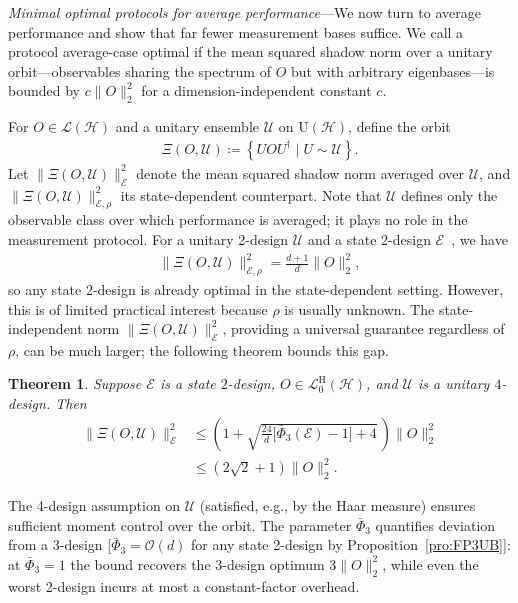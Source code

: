 \documentclass[aps,pra,twocolumn,nofootinbib,superscriptaddress,10pt]{revtex4-2}
\newtheorem{theorem}{Theorem}
\newcommand{\caE}{\mathcal{E}}
\newcommand{\caH}{\mathcal{H}}
\newcommand{\caL}{\mathcal{L}}
\newcommand{\caO}{\mathcal{O}}
\newcommand{\caU}{\mathcal{U}}
\newcommand{\rmH}{\mathrm{H}}
\newcommand{\rmU}{\mathrm{U}}
\newcommand{\bPhi}{\bar{\Phi}}
\newcommand{\pref}[1]{Proposition~\ref{#1}}
\begin{document}

    \emph{Minimal optimal protocols for average performance}---We now turn to average performance and show that far fewer measurement bases suffice. We call a protocol average-case optimal if the mean squared shadow norm over a unitary orbit---observables sharing the spectrum of $O$ but with arbitrary eigenbases---is bounded by $c\|O\|_2^2$ for a dimension-independent constant $c$.

For $O\in\caL(\caH)$ and a unitary ensemble $\caU$ on $\rmU(\caH)$, define the orbit
\begin{align}
	\Xi(O,\caU)\coloneqq \left\{UOU^\dagger \mid U\sim\caU\right\}.
\end{align}
Let $\|\Xi(O,\caU)\|_\caE^2$ denote the mean squared shadow norm averaged over $\caU$, and $\|\Xi(O,\caU)\|_{\caE,\rho}^2$ its state-dependent counterpart. Note that $\caU$ defines only the observable class over which performance is averaged; it plays no role in the measurement protocol. For a unitary 2-design $\caU$ and a state 2-design $\caE$~\cite{InnocentiLP23,chenZ24}, we have
\begin{align}\label{eq:SDopt}
	\|\Xi(O,\caU)\|_{\caE,\rho}^2 = \frac{d+1}{d}\|O\|_2^2,
\end{align}
so any state 2-design is already optimal in the state-dependent setting. However, this is of limited practical interest because $\rho$ is usually unknown. The state-independent norm $\|\Xi(O,\caU)\|_\caE^2$, providing a universal guarantee regardless of $\rho$, can be much larger; the following theorem bounds this gap.
\begin{theorem}\label{thm:AvgShNormUB}
	Suppose $\caE$ is a state $2$-design, $O\in\caL^{\rmH}_0(\caH)$, and $\caU$ is a unitary $4$-design. Then
	\begin{align}
		\|\Xi(O,\caU)\|_\caE^2 &\le \left(1 + \sqrt{\frac{24}{d}\big[\bPhi_3(\caE){-}1\big] + 4}\,\right)\|O\|_2^2 \nonumber\\
		&\le \left(2\sqrt{2}+1\right)\|O\|_2^2. \label{eq:AvgShNormUB}
	\end{align}
\end{theorem}
The 4-design assumption on $\caU$ (satisfied, e.g., by the Haar measure) ensures sufficient moment control over the orbit.  The parameter $\bPhi_3$ quantifies deviation from a 3-design [$\bPhi_3 = \caO(d)$ for any state 2-design by \pref{pro:FP3UB}]: at $\bPhi_3=1$ the bound recovers the 3-design optimum $3\|O\|_2^2$, while even the worst 2-design incurs at most a constant-factor overhead.
\end{document}
